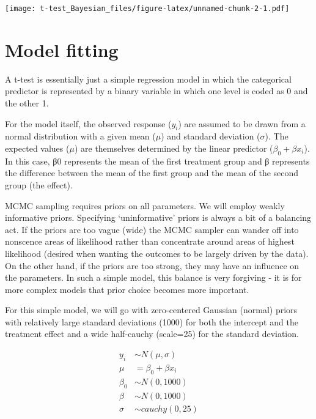 \documentclass[
]{article}
\begin{document}
\texttt{[image: t-test\_Bayesian\_files/figure-latex/unnamed-chunk-2-1.pdf]}

\hypertarget{model-fitting}{%
\section{Model fitting}\label{model-fitting}}

A t-test is essentially just a simple regression model in which the
categorical predictor is represented by a binary variable in which one
level is coded as 0 and the other 1.

For the model itself, the observed response (\(y_{i}\)) are assumed to
be drawn from a normal distribution with a given mean (\(\mu\)) and
standard deviation (\(\sigma\)). The expected values (\(\mu\)) are
themselves determined by the linear predictor (\(\beta_0 + \beta x_i\)).
In this case, β0 represents the mean of the first treatment group and β
represents the difference between the mean of the first group and the
mean of the second group (the effect).

MCMC sampling requires priors on all parameters. We will employ weakly
informative priors. Specifying `uninformative' priors is always a bit of
a balancing act. If the priors are too vague (wide) the MCMC sampler can
wander off into nonscence areas of likelihood rather than concentrate
around areas of highest likelihood (desired when wanting the outcomes to
be largely driven by the data). On the other hand, if the priors are too
strong, they may have an influence on the parameters. In such a simple
model, this balance is very forgiving - it is for more complex models
that prior choice becomes more important.

For this simple model, we will go with zero-centered Gaussian (normal)
priors with relatively large standard deviations (1000) for both the
intercept and the treatment effect and a wide half-cauchy (scale=25) for
the standard deviation.

\[
\begin{align}
y_i &\sim{} N(\mu, \sigma)\\
\mu &= \beta_0 + \beta x_i\\[1em]
\beta_0 &\sim{} N(0,1000)\\
\beta &\sim{} N(0,1000)\\
\sigma &\sim{} cauchy(0,25)\\
\end{align}
\]
\end{document}
